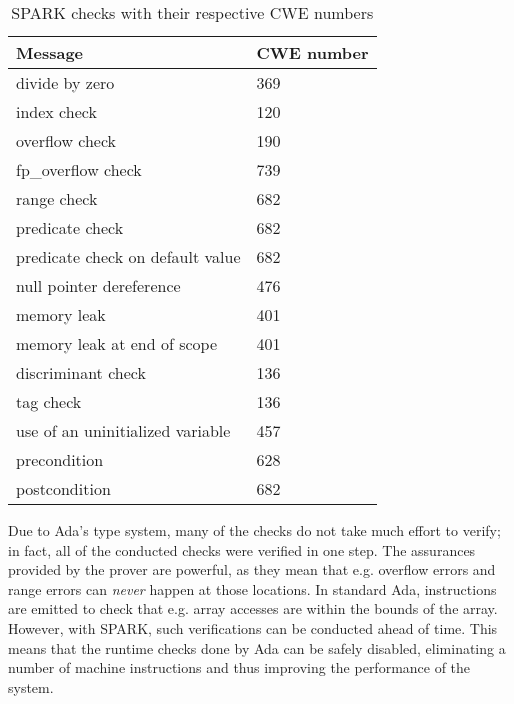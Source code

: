 \begin{table}[h]
  \centering
  \vspace{1em}
  \renewcommand{\arraystretch}{1.5}
  \begin{tabular}{| l | l |}
    \hline
    \textbf{Message} & \textbf{CWE number} \\ \hline
    divide by zero & 369 \\ \hline
    index check & 120 \\ \hline
    overflow check & 190 \\ \hline
    fp\_overflow check & 739 \\ \hline
    range check & 682 \\ \hline
    predicate check & 682 \\ \hline
    predicate check on default value & 682 \\ \hline
    null pointer dereference & 476 \\ \hline
    memory leak & 401 \\ \hline
    memory leak at end of scope & 401 \\ \hline
    discriminant check & 136 \\ \hline
    tag check & 136 \\ \hline
    use of an uninitialized variable & 457 \\ \hline
    precondition & 628 \\ \hline
    postcondition & 682 \\ \hline
  \end{tabular}
  \renewcommand{\arraystretch}{1}
  \vspace{1em}
  \caption{SPARK checks with their respective CWE numbers}
  \label{tab:checks and cwe numbers}
\end{table}

Due to Ada's type system, many of the checks do not take much effort to verify; in fact, all of the conducted checks were verified in one step.
The assurances provided by the prover are powerful, as they mean that e.g. overflow errors and range errors can \textit{never} happen at those locations.
In standard Ada, instructions are emitted to check that e.g. array accesses are within the bounds of the array.
However, with SPARK, such verifications can be conducted ahead of time.
This means that the runtime checks done by Ada can be safely disabled, eliminating a number of machine instructions and thus improving the performance of the system.

